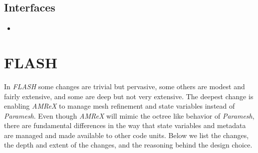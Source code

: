 \documentclass{article}
\newcommand{\flash}{{\it FLASH}\xspace}
\newcommand{\amrex}{{\it AMReX}\xspace}
\newcommand{\paramesh}{{\it Paramesh}\xspace}
\begin{document}
\subsection{Interfaces}
\label{sec:chimera-interfaces}
\begin{itemize}
\item
\end{itemize}

\section{FLASH}
\label{sec:flash}
 In \flash some changes are trivial but pervasive, some others are
modest and fairly extensive, and some are deep but not very
extensive. The deepest change is enabling \amrex to manage mesh
refinement and state variables instead of \paramesh. Even though
\amrex will mimic the octree like behavior of \paramesh, there are
fundamental differences in the way that state variables and metadata
are managed and made available to other code units. Below we list the
changes, the depth and extent of the changes, and the reasoning behind
the design choice.
\end{document}
